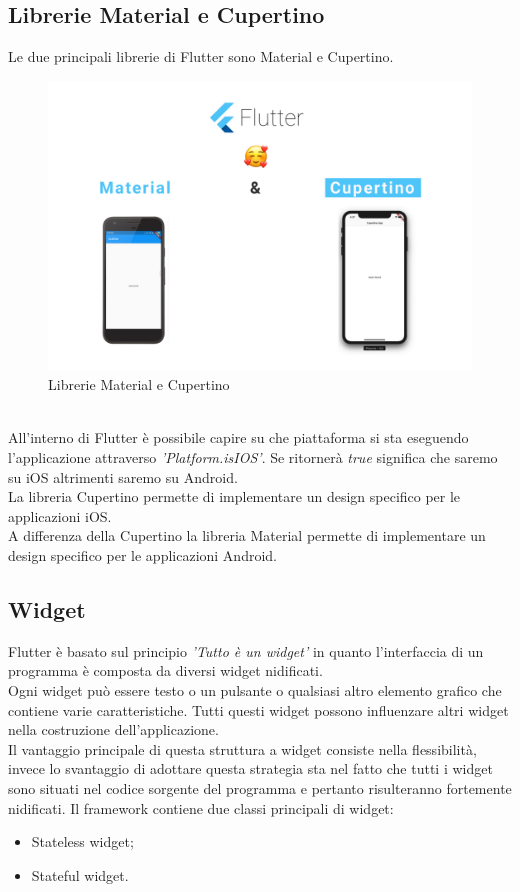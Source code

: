 \subsection{Librerie Material e Cupertino}
Le due principali librerie di Flutter sono Material e Cupertino.\\
\begin{figure}[htbp]	
	\centering
	\includegraphics[width=14cm]{immagini/librerieCM.png}
	\caption{Librerie Material e Cupertino}
	\label{fig:Librerie Material e Cupertino}
\end{figure}
\\
All'interno di Flutter è possibile capire su che piattaforma si sta eseguendo l'applicazione attraverso \textit{'Platform.isIOS'}. Se ritornerà \textit{true} significa che saremo su iOS altrimenti saremo su Android.\\
La libreria Cupertino permette di implementare un design specifico per le applicazioni iOS.\\
A differenza della Cupertino la libreria Material permette di implementare un design specifico per le applicazioni Android.

\subsection{Widget}
\label{sec:Widget}
Flutter è basato sul principio \textit{'Tutto è un widget'} in quanto l'interfaccia di un programma è composta da diversi widget nidificati.\\
Ogni widget può essere testo o un pulsante o qualsiasi altro elemento grafico che contiene varie caratteristiche. Tutti questi widget possono influenzare altri widget nella costruzione dell'applicazione.\\
Il vantaggio principale di questa struttura a widget consiste nella flessibilità, invece lo svantaggio di adottare questa strategia sta nel fatto che tutti i widget sono situati nel codice sorgente del programma e pertanto risulteranno fortemente nidificati.
\newpage
Il framework contiene due classi principali di widget:
\begin{itemize}
	\item Stateless widget;   
	\item Stateful widget.
\end{itemize}

